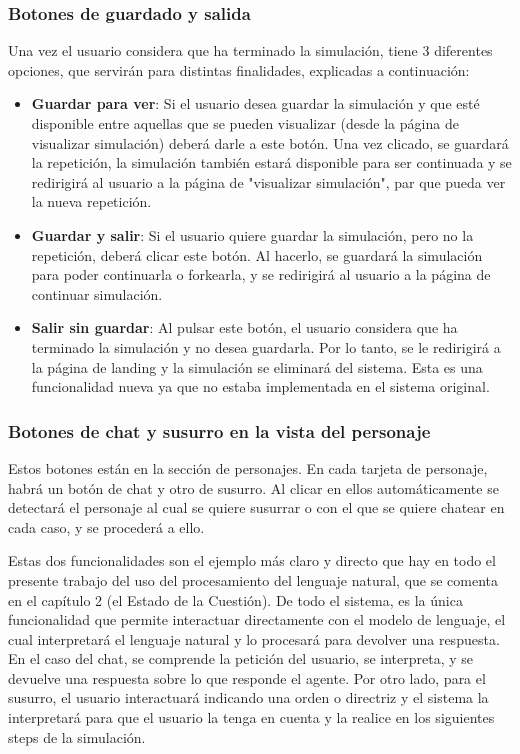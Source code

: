 \subsubsection{Botones de guardado y salida}

Una vez el usuario considera que ha terminado la simulación, tiene 3 diferentes opciones, que servirán para distintas finalidades, explicadas a continuación:

\begin{itemize}
	
	\item \textbf{Guardar para ver}: Si el usuario desea guardar la simulación y que esté disponible entre aquellas que se pueden visualizar (desde la página de visualizar simulación) deberá darle a este botón. Una vez clicado, se guardará la repetición, la simulación también estará disponible para ser continuada y se redirigirá al usuario a la página de "visualizar simulación", par que pueda ver la nueva repetición.
	
	\item \textbf{Guardar y salir}: Si el usuario quiere guardar la simulación, pero no la repetición, deberá clicar este botón. Al hacerlo, se guardará la simulación para poder continuarla o forkearla, y se redirigirá al usuario a la página de continuar simulación.
	
	\item \textbf{Salir sin guardar}: Al pulsar este botón, el usuario considera que ha terminado la simulación y no desea guardarla. Por lo tanto, se le redirigirá a la página de landing y la simulación se eliminará del sistema. Esta es una funcionalidad nueva ya que no estaba implementada en el sistema original.

\end{itemize}

\subsubsection{Botones de chat y susurro en la vista del personaje}
\label{botonSusurro}

Estos botones están en la sección de personajes. En cada tarjeta de personaje, habrá un botón de chat y otro de susurro. Al clicar en ellos automáticamente se detectará el personaje al cual se quiere susurrar o con el que se quiere chatear en cada caso, y se procederá a ello.

Estas dos funcionalidades son el ejemplo más claro y directo que hay en todo el presente trabajo del uso del procesamiento del lenguaje natural, que se comenta en el capítulo 2 (el Estado de la Cuestión). De todo el sistema, es la única funcionalidad que permite interactuar directamente con el modelo de lenguaje, el cual interpretará el lenguaje natural y lo procesará para devolver una respuesta. En el caso del chat, se comprende la petición del usuario, se interpreta, y se devuelve una respuesta sobre lo que responde el agente. Por otro lado, para el susurro, el usuario interactuará indicando una orden o directriz y el sistema la interpretará para que el usuario la tenga en cuenta y la realice en los siguientes steps de la simulación.

